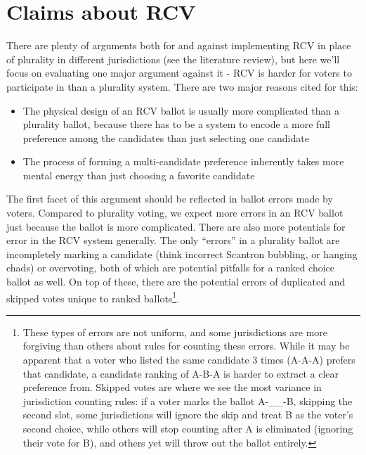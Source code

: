 \documentclass[12pt,twoside]{reedthesis}
\theoremstyle{definition}
\theoremstyle{definition}
\theoremstyle{definition}
\theoremstyle{remark}
\begin{document}
\hypertarget{claims-about-rcv}{%
\section{Claims about RCV}\label{claims-about-rcv}}

There are plenty of arguments both for and against implementing RCV in
place of plurality in different jurisdictions (see the literature
review), but here we'll focus on evaluating one major argument against
it - RCV is harder for voters to participate in than a plurality system.
There are two major reasons cited for this:
\begin{itemize}
\item
  The physical design of an RCV ballot is usually more complicated than
  a plurality ballot, because there has to be a system to encode a more
  full preference among the candidates than just selecting one candidate
\item
  The process of forming a multi-candidate preference inherently takes
  more mental energy than just choosing a favorite candidate
\end{itemize}
The first facet of this argument should be reflected in ballot errors
made by voters. Compared to plurality voting, we expect more errors in
an RCV ballot just because the ballot is more complicated. There are
also more potentials for error in the RCV system generally. The only
``errors'' in a plurality ballot are incompletely marking a candidate
(think incorrect Scantron bubbling, or hanging chads) or overvoting,
both of which are potential pitfalls for a ranked choice ballot as well.
On top of these, there are the potential errors of duplicated and
skipped votes unique to ranked ballots\footnote{These types of errors
  are not uniform, and some jurisdictions are more forgiving than others
  about rules for counting these errors. While it may be apparent that a
  voter who listed the same candidate 3 times (A-A-A) prefers that
  candidate, a candidate ranking of A-B-A is harder to extract a clear
  preference from. Skipped votes are where we see the most variance in
  jurisdiction counting rules: if a voter marks the ballot A-\_\_-B,
  skipping the second slot, some jurisdictions will ignore the skip and
  treat B as the voter's second choice, while others will stop counting
  after A is eliminated (ignoring their vote for B), and others yet will
  throw out the ballot entirely.}.
\end{document}

